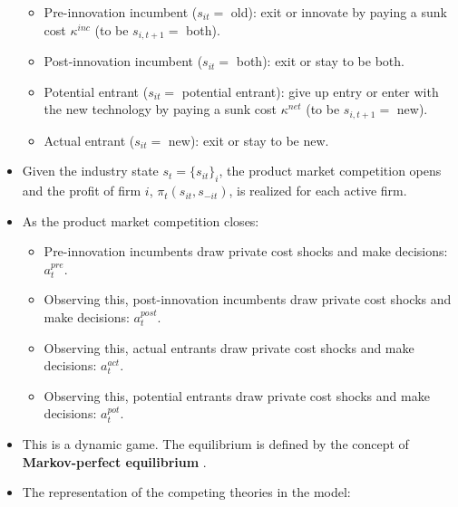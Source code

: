 \documentclass[
]{book}
\providecommand{\tightlist}{%
  \setlength{\itemsep}{0pt}\setlength{\parskip}{0pt}}
\begin{document}
\begin{itemize}
  \begin{itemize}
  \tightlist
  \item
    Pre-innovation incumbent (\(s_{it} =\) old): exit or innovate by paying a sunk cost \(\kappa^{inc}\) (to be \(s_{i, t + 1} =\) both).
  \item
    Post-innovation incumbent (\(s_{it} =\) both): exit or stay to be both.
  \item
    Potential entrant (\(s_{it} =\) potential entrant): give up entry or enter with the new technology by paying a sunk cost \(\kappa^{net}\) (to be \(s_{i, t + 1} =\) new).
  \item
    Actual entrant (\(s_{it} =\) new): exit or stay to be new.
  \end{itemize}
\item
  Given the industry state \(s_t = \{s_{it}\}_i\), the product market competition opens and the profit of firm \(i\), \(\pi_t(s_{it}, s_{-it})\), is realized for each active firm.
\item
  As the product market competition closes:

  \begin{itemize}
  \tightlist
  \item
    Pre-innovation incumbents draw private cost shocks and make decisions: \(a_t^{pre}\).
  \item
    Observing this, post-innovation incumbents draw private cost shocks and make decisions: \(a_t^{post}\).
  \item
    Observing this, actual entrants draw private cost shocks and make decisions: \(a_t^{act}\).
  \item
    Observing this, potential entrants draw private cost shocks and make decisions: \(a_t^{pot}\).
  \end{itemize}
\item
  This is a dynamic game. The equilibrium is defined by the concept of \textbf{Markov-perfect equilibrium} \citep{Maskin1988}.
\item
  The representation of the competing theories in the model:


\end{itemize}
\end{document}
